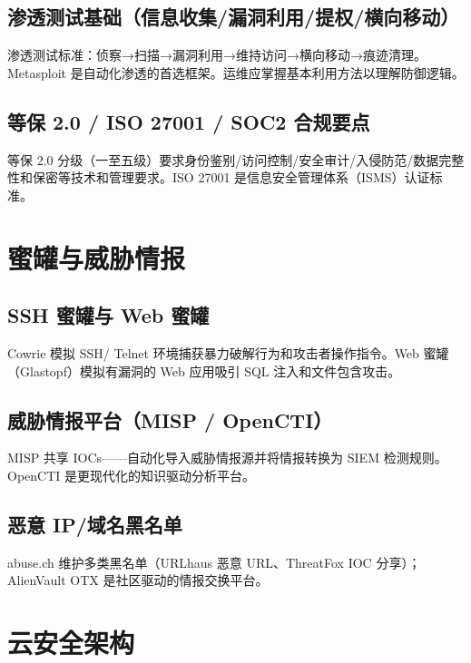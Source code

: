 \documentclass[12pt,UTF8]{ctexbook}
\begin{document}
  \section{渗透测试基础（信息收集/漏洞利用/提权/横向移动）}

渗透测试标准：侦察→扫描→漏洞利用→维持访问→横向移动→痕迹清理。Metasploit 是自动化渗透的首选框架。运维应掌握基本利用方法以理解防御逻辑。

  \section{等保 2.0 / ISO 27001 / SOC2 合规要点}

等保 2.0 分级（一至五级）要求身份鉴别/访问控制/安全审计/入侵防范/数据完整性和保密等技术和管理要求。ISO 27001 是信息安全管理体系（ISMS）认证标准。


\chapter{蜜罐与威胁情报}
\label{chap:honeypot-threat}

  \section{SSH 蜜罐与 Web 蜜罐}

Cowrie 模拟 SSH/ Telnet 环境捕获暴力破解行为和攻击者操作指令。Web 蜜罐（Glastopf）模拟有漏洞的 Web 应用吸引 SQL 注入和文件包含攻击。

  \section{威胁情报平台（MISP / OpenCTI）}

MISP 共享 IOCs——自动化导入威胁情报源并将情报转换为 SIEM 检测规则。OpenCTI 是更现代化的知识驱动分析平台。

  \section{恶意 IP/域名黑名单}

abuse.ch 维护多类黑名单（URLhaus 恶意 URL、ThreatFox IOC 分享）；AlienVault OTX 是社区驱动的情报交换平台。


\chapter{云安全架构}
\label{chap:cloud-security}
\end{document}
